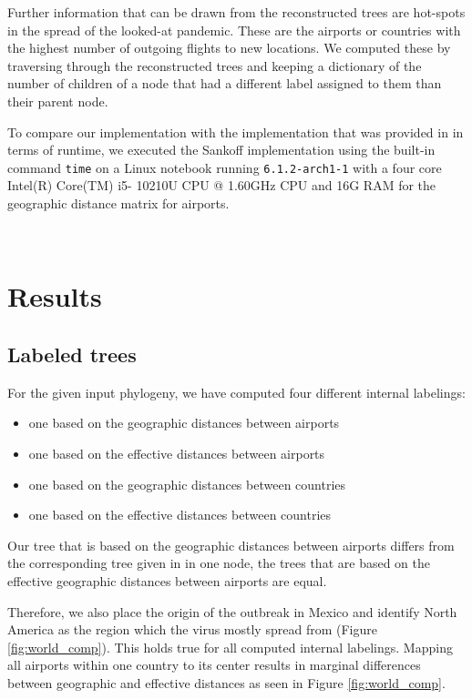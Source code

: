 \documentclass{article}
\begin{document}
Further information that can be drawn from the reconstructed trees are hot-spots in the spread of the looked-at pandemic. These are the airports or countries with the highest number of outgoing flights to new locations. We computed these by traversing through the reconstructed trees and keeping a dictionary of the number of children of a node that had a different label assigned to them than their parent node.

To compare our implementation with the implementation that
was provided in \cite{reimeringPhylogeographicReconstructionUsing2020} in terms of runtime, we
executed the Sankoff implementation using the built-in command \texttt{time} on
a Linux notebook running \texttt{6.1.2-arch1-1} with a four core Intel(R) Core(TM) i5-
10210U CPU @ 1.60GHz CPU and 16G RAM for the geographic distance matrix for airports.

\ \\
\section{Results}

\subsection{Labeled trees}
For the given input phylogeny, we have computed four different internal labelings: 
\begin{itemize}
    \item one based on the geographic distances between airports
    \item one based on the effective distances between airports
    \item one based on the geographic distances between countries
    \item one based on the effective distances between countries
\end{itemize}

Our tree that is based on the geographic distances between airports differs from the corresponding tree given in
\cite{reimeringPhylogeographicReconstructionUsing2020} in
one node, the trees that are based
on the effective geographic distances between airports are equal. 

Therefore, we also place the origin of the outbreak in Mexico and identify North America as the region which the virus mostly spread from (Figure \ref{fig:world_comp}). This holds true for all computed internal labelings. Mapping all airports within one country to its center results in marginal differences between geographic and effective distances as seen in Figure \ref{fig:world_comp}. 
\end{document}
